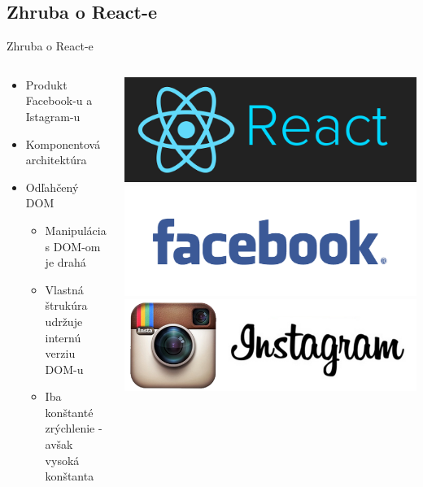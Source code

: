 \subsection{Zhruba o React-e}
\begin{frame}{Zhruba o React-e}
	\begin{columns}[T]
		\begin{column}{.5\textwidth}
			\begin{itemize}
				\item Produkt Facebook-u a Istagram-u
				\item Komponentová architektúra
				\item Odľahčený DOM
					\begin{itemize}
						\item Manipulácia s DOM-om je drahá
						\item Vlastná štrukúra udržuje internú verziu DOM-u
						\item Iba konštanté zrýchlenie - avšak vysoká konštanta
					\end{itemize}
			\end{itemize}
		\end{column}
		\begin{column}{.5\textwidth}
			\includegraphics[scale=0.3]{images/react-logo.png}\\
			\includegraphics[scale=0.2]{images/facebook.png}\\
			\includegraphics[scale=0.15]{images/istagram.png}
		\end{column}
	\end{columns}
\end{frame}

